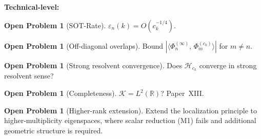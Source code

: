 \documentclass[12pt,a4paper]{amsart}
\theoremstyle{definition}
\newtheorem{problem}[theorem]{Open Problem}
\theoremstyle{remark}
\newcommand{\ip}[2]{\langle #1,\, #2\rangle}
\begin{document}
\noindent\textbf{Technical-level:}

\begin{problem}[SOT-Rate]
\label{prob:sot-rate}
$\varepsilon_n(k)=O(c_k^{-1/4})$.
\end{problem}

\begin{problem}[Off-diagonal overlaps]
\label{prob:off-diagonal}
Bound
$|\ip{\Phi_n^{(\infty)}}
{\Phi_m^{(c_k)}}|$
for $m\ne n$.
\end{problem}

\begin{problem}[Strong resolvent
  convergence]
\label{prob:src}
Does $\mathcal{H}_{c_k}$ converge
in strong resolvent sense?
\end{problem}

\begin{problem}[Completeness]
\label{prob:completeness}
$\mathcal{K}=L^2(\mathbb{R})$?
Paper~XIII.
\end{problem}

\begin{problem}[Higher-rank extension]
\label{prob:higher-rank}
Extend the localization principle
to higher-multiplicity eigenspaces,
where scalar reduction (M1) fails
and additional geometric structure
is required.
\end{problem}
\end{document}
